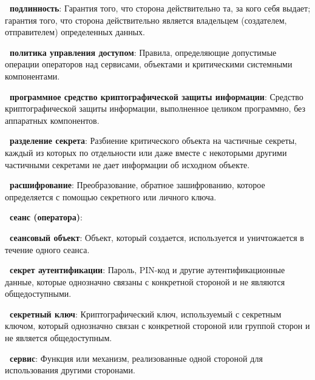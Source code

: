 {\bf \thedefctr~подлинность}:
Гарантия того, что сторона действительно та, за кого себя выдает; гарантия того,
что сторона действительно является владельцем (создателем, отправителем)
определенных данных.

{\bf \thedefctr~политика управления доступом}:
Правила, определяющие допустимые операции операторов над сервисами, объектами и
критическими системными компонентами.

{\bf \thedefctr~программное средство криптографической защиты информации}:
Средство криптографической защиты информации, выполненное целиком программно, 
без аппаратных компонентов. 

{\bf \thedefctr~разделение секрета}:
Разбиение критического объекта на частичные секреты, 
каждый из которых по отдельности или даже вместе с некоторыми
другими частичными секретами не дает информации об исходном объекте.

{\bf \thedefctr~расшифрование}:
Преобразование, обратное зашифрованию, которое определяется с помощью
секретного или личного ключа.

{\bf \thedefctr~сеанс (оператора)}:


{\bf \thedefctr~сеансовый объект}:
Объект, который создается, 
используется и уничтожается в течение одного сеанса.

{\bf \thedefctr~секрет аутентификации}:
Пароль, PIN-код и другие аутентификационные данные, которые однозначно связаны с
конкретной стороной и не являются общедоступными.

{\bf \thedefctr~секретный ключ}:
Криптографический ключ, используемый  
с секретным ключом, который однозначно связан с конкретной стороной или группой
сторон и не является общедоступным.


{\bf \thedefctr~сервис}:
Функция или механизм, реализованные одной стороной для использования другими 
сторонами.

%

